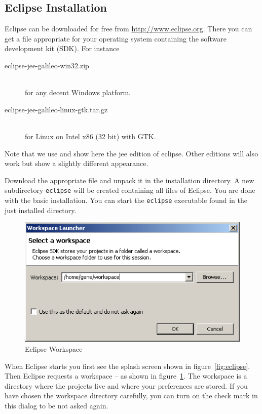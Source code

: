 \subsection{Eclipse Installation}

Eclipse can be downloaded for free from \url{http://www.eclipse.org}.
There you can get a file appropriate for your operating system
containing the software development kit (SDK). For instance
\begin{description}
\item [eclipse-jee-galileo-win32.zip]\ \\
  for any decent Windows platform.
\item [eclipse-jee-galileo-linux-gtk.tar.gz]\ \\
  for Linux on Intel x86 (32 bit) with GTK.
\end{description}

Note that we use and show here the jee edition of eclipse. Other
editions will also work but show a slightly different appearance.

Download the appropriate file and unpack it in the installation
directory. A new subdirectory \texttt{eclipse} will be created
containing all files of Eclipse. You are done with the basic
installation. You can start the \texttt{eclipse} executable found in
the just installed directory.

\begin{figure}[h]
  \centering  \includegraphics[scale=.5]{image/eclipse-workspace}
  \caption{Eclipse Workspace}\label{fig:eclipse-workspace}
\end{figure}
When Eclipse starts you first see the splash screen shown in
figure~\ref{fig:eclipse}. Then Eclipse requests a workspace -- as
shown in figure~\ref{fig:eclipse-workspace}. The workspace is a
directory where the projects live and where your preferences are
stored. If you have chosen the workspace directory carefully, you can
turn on the check mark in this dialog to be not asked again.

